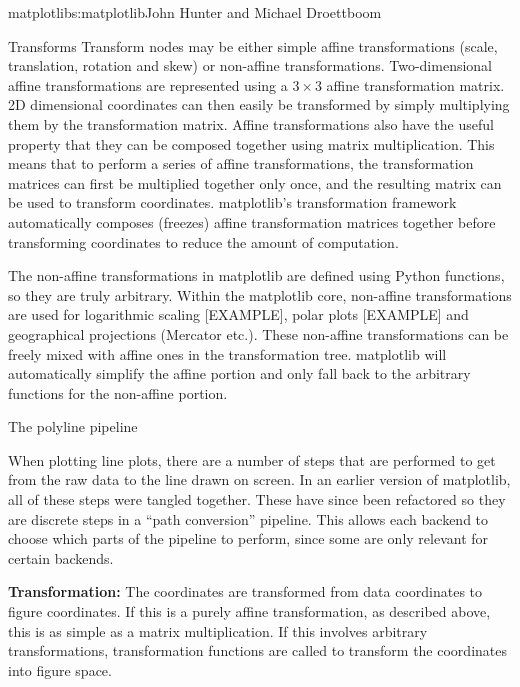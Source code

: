 \begin{aosachapter}{matplotlib}{s:matplotlib}{John Hunter and Michael Droettboom}
\begin{aosasect1}{Transforms}
Transform nodes may be either simple affine transformations (scale,
translation, rotation and skew) or non-affine transformations.
Two-dimensional affine transformations are represented using a $3
\times 3$ affine transformation matrix.  2D dimensional coordinates can
then easily be transformed by simply multiplying them by the
transformation matrix.  Affine transformations also have the useful
property that they can be composed together using matrix
multiplication.  This means that to perform a series of affine
transformations, the transformation matrices can first be multiplied
together only once, and the resulting matrix can be used to transform
coordinates.  matplotlib's transformation framework automatically
composes (freezes) affine transformation matrices together before
transforming coordinates to reduce the amount of computation.

The non-affine transformations in matplotlib are defined using Python
functions, so they are truly arbitrary.  Within the matplotlib core,
non-affine transformations are used for logarithmic scaling [EXAMPLE],
polar plots [EXAMPLE] and geographical projections (Mercator etc.).
These non-affine transformations can be freely mixed with affine ones
in the transformation tree.  matplotlib will automatically simplify
the affine portion and only fall back to the arbitrary functions for
the non-affine portion.


\end{aosasect1}

\begin{aosasect1}{The polyline pipeline}

When plotting line plots, there are a number of steps that are
performed to get from the raw data to the line drawn on screen.  In an
earlier version of matplotlib, all of these steps were tangled
together.  These have since been refactored so they are discrete steps
in a ``path conversion'' pipeline.  This allows each backend to choose
which parts of the pipeline to perform, since some are only relevant
for certain backends.

\begin{aosaenumerate}

\item \textbf{Transformation:} The coordinates are transformed from data
  coordinates to figure coordinates.  If this is a purely affine
  transformation, as described above, this is as simple as a matrix
  multiplication.  If this involves arbitrary transformations,
  transformation functions are called to transform the coordinates
  into figure space.


\end{aosaenumerate}
\end{aosasect1}
\end{aosachapter}
